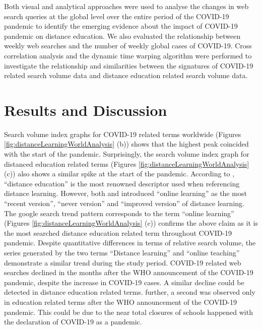 \documentclass[11pt,a4paper,]{article}
\begin{document}
Both visual and analytical approaches were used to analyse the changes in web search queries at the global level over the entire period of the COVID-19 pandemic to identify the emerging evidence about the impact of COVID-19 pandemic on distance education. We also evaluated the relationship between weekly web searches and the number of weekly global cases of COVID-19. Cross correlation analysis and the dynamic time warping algorithm \autocite{giorgino2009computing} were performed to investigate the relationship and similarities between the signatures of COVID-19 related search volume data and distance education related search volume data.

\hypertarget{results-and-discussion}{%
\section{Results and Discussion}\label{results-and-discussion}}

Search volume index graphs for COVID-19 related terms worldwide (Figures \ref{fig:distanceLearningWorldAnalysis} (b)) shows that the highest peak coincided with the start of the pandemic. Surprisingly, the search volume index graph for distanced education related terms (Figures \ref{fig:distanceLearningWorldAnalysis} (c)) also shows a similar spike at the start of the pandemic. According to \textcite{moore2011learning}, ``distance education'' is the most renowned descriptor used when referencing distance learning. However, both \textcite{benson2002usability} and \textcite{conrad2002deep} introduced ``online learning'' as the most ``recent version'', ``never version'' and ``improved version'' of distance learning. The google search trend pattern corresponds to the term ``online learning'' (Figures \ref{fig:distanceLearningWorldAnalysis} (c)) confirms the above claim as it is the most searched distance education related term throughout COVID-19 pandemic. Despite quantitative differences in terms of relative search volume, the series generated by the two terms ``Distance learning'' and ``online teaching'' demonstrate a similar trend during the study period. COVID-19 related web searches declined in the months after the WHO announcement of the COVID-19 pandemic, despite the increase in COVID-19 cases. A similar decline could be detected in distance education related terms. further, a second was observed only in education related terms after the WHO announcement of the COVID-19 pandemic. This could be due to the near total closures of schools happened with the declaration of COVID-19 as a pandemic.
\end{document}
